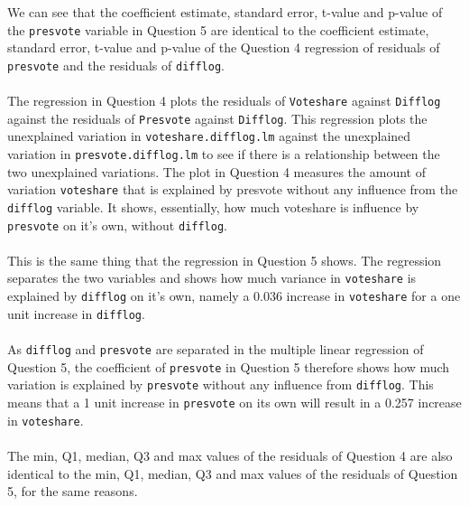 \documentclass[12pt,letterpaper]{article}
\begin{document}
\begin{enumerate}
\noindent We can see that the coefficient estimate, standard error, t-value and p-value of the \texttt{presvote} variable in Question 5 are identical to the coefficient estimate, standard error, t-value and p-value of the Question 4 regression of residuals of \texttt{presvote} and the residuals of \texttt{difflog}.
\\\\
\noindent The regression in Question 4 plots the residuals of \texttt{Voteshare} against \texttt{Difflog} against the residuals of \texttt{Presvote} against \texttt{Difflog}. This regression plots the unexplained variation in \texttt{voteshare.difflog.lm} against the unexplained variation in \texttt{presvote.difflog.lm} to see if there is a relationship between the two unexplained variations. The plot in Question 4 measures the amount of variation \texttt{voteshare} that is explained by presvote without any influence from the \texttt{difflog} variable. It shows, essentially, how much voteshare is influence by \texttt{presvote} on it's own, without \texttt{difflog}.
\\\\
\noindent This is the same thing that the regression in Question 5 shows. The regression separates the two variables and shows how much variance in \texttt{voteshare} is explained by \texttt{difflog} on it's own, namely a 0.036 increase in \texttt{voteshare} for a one unit increase in \texttt{difflog}. 
\\\\
\noindent As \texttt{difflog} and \texttt{presvote} are separated in the multiple linear regression of Question 5, the coefficient of \texttt{presvote} in Question 5 therefore shows how much variation is explained by \texttt{presvote} without any influence from \texttt{difflog}. This means that a 1 unit increase in \texttt{presvote} on its own will result in a 0.257 increase in \texttt{voteshare}.
\\\\
\noindent The min, Q1, median, Q3 and max values of the residuals of Question 4 are also identical to the min, Q1, median, Q3 and max values of the residuals of Question 5, for the same reasons.  	

	\end{enumerate}
\end{document}
